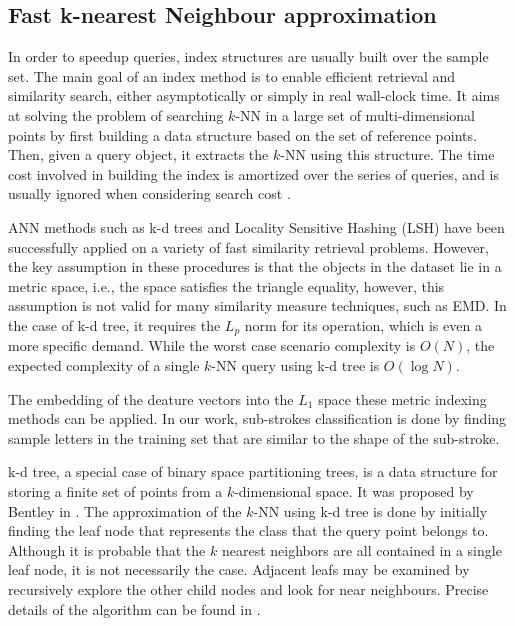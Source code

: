 \documentclass[10pt, conference, compsocconf]{IEEEtran}
\theoremstyle{definition}
\begin{document}
\subsection{Fast k-nearest Neighbour approximation}
In order to speedup queries, index structures are usually built over the sample set. 
The main goal of an index method is to enable efficient retrieval and similarity search, either asymptotically or simply in real wall-clock time. 
It aims at solving the problem of searching $k$-NN in a large set of multi-dimensional points by first building a data structure based on the set of reference points. Then, given a query object, it extracts the $k$-NN using this structure.
The time cost involved in building the index is amortized over the series of queries, and is usually ignored when considering search cost \cite{hetland2009basic}.

ANN methods such as k-d trees and Locality Sensitive Hashing (LSH) \cite{gionis1999similarity} have been successfully applied on a variety of fast similarity retrieval problems. 
However, the key assumption in these procedures is that the objects in the dataset lie in a metric space, i.e., the space satisfies the triangle equality, however, this assumption is not valid for many similarity measure techniques, such as EMD.
In the case of k-d tree, it requires the $L_p$ norm for its operation, which is even a more specific demand.
While the worst case scenario complexity is $O(N)$, the expected complexity of a single $k$-NN query using k-d tree is $O(\log N)$.

The embedding of the deature vectors into the $L_1$ space these metric indexing methods can be applied. 
In our work, sub-strokes classification is done by finding sample letters in the training set that are similar to the shape of the sub-stroke.

k-d tree, a special case of binary space partitioning trees, is a data structure for storing a finite set of points from a $k$-dimensional space. 
It was proposed by Bentley in \cite{bentley1975multidimensional}. 
The approximation of the $k$-NN using k-d tree is done by initially finding the leaf node that represents the class that the query point belongs to. 
Although it is probable that the $k$ nearest neighbors are all contained in a single leaf node, it is not necessarily the case. 
Adjacent leafs may be examined by recursively explore the other child nodes and look for near neighbours. 
Precise details of the algorithm can be found in \cite{bentley1975multidimensional}.
\end{document}
